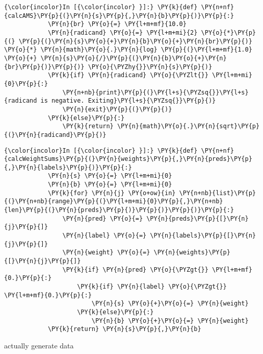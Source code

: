     \begin{Verbatim}[commandchars=\\\{\}]
{\color{incolor}In [{\color{incolor} }]:} \PY{k}{def} \PY{n+nf}{calcAMS}\PY{p}{(}\PY{n}{s}\PY{p}{,}\PY{n}{b}\PY{p}{)}\PY{p}{:}    
            \PY{n}{br} \PY{o}{=} \PY{l+m+mf}{10.0}
            \PY{n}{radicand} \PY{o}{=} \PY{l+m+mi}{2} \PY{o}{*}\PY{p}{(} \PY{p}{(}\PY{n}{s}\PY{o}{+}\PY{n}{b}\PY{o}{+}\PY{n}{br}\PY{p}{)} \PY{o}{*} \PY{n}{math}\PY{o}{.}\PY{n}{log} \PY{p}{(}\PY{l+m+mf}{1.0} \PY{o}{+} \PY{n}{s}\PY{o}{/}\PY{p}{(}\PY{n}{b}\PY{o}{+}\PY{n}{br}\PY{p}{)}\PY{p}{)} \PY{o}{\PYZhy{}}\PY{n}{s}\PY{p}{)}
            \PY{k}{if} \PY{n}{radicand} \PY{o}{\PYZlt{}} \PY{l+m+mi}{0}\PY{p}{:}
                \PY{n+nb}{print}\PY{p}{(}\PY{l+s}{\PYZsq{}}\PY{l+s}{radicand is negative. Exiting}\PY{l+s}{\PYZsq{}}\PY{p}{)}
                \PY{n}{exit}\PY{p}{(}\PY{p}{)}
            \PY{k}{else}\PY{p}{:}
                \PY{k}{return} \PY{n}{math}\PY{o}{.}\PY{n}{sqrt}\PY{p}{(}\PY{n}{radicand}\PY{p}{)}
\end{Verbatim}

    \begin{Verbatim}[commandchars=\\\{\}]
{\color{incolor}In [{\color{incolor} }]:} \PY{k}{def} \PY{n+nf}{calcWeightSums}\PY{p}{(}\PY{n}{weights}\PY{p}{,}\PY{n}{preds}\PY{p}{,}\PY{n}{labels}\PY{p}{)}\PY{p}{:}
            \PY{n}{s} \PY{o}{=} \PY{l+m+mi}{0}
            \PY{n}{b} \PY{o}{=} \PY{l+m+mi}{0}
            \PY{k}{for} \PY{n}{j} \PY{o+ow}{in} \PY{n+nb}{list}\PY{p}{(}\PY{n+nb}{range}\PY{p}{(}\PY{l+m+mi}{0}\PY{p}{,}\PY{n+nb}{len}\PY{p}{(}\PY{n}{preds}\PY{p}{)}\PY{p}{)}\PY{p}{)}\PY{p}{:}
                \PY{n}{pred} \PY{o}{=} \PY{n}{preds}\PY{p}{[}\PY{n}{j}\PY{p}{]}
                \PY{n}{label} \PY{o}{=} \PY{n}{labels}\PY{p}{[}\PY{n}{j}\PY{p}{]}
                \PY{n}{weight} \PY{o}{=} \PY{n}{weights}\PY{p}{[}\PY{n}{j}\PY{p}{]}
                \PY{k}{if} \PY{n}{pred} \PY{o}{\PYZgt{}} \PY{l+m+mf}{0.}\PY{p}{:}
                    \PY{k}{if} \PY{n}{label} \PY{o}{\PYZgt{}} \PY{l+m+mf}{0.}\PY{p}{:}
                        \PY{n}{s} \PY{o}{+}\PY{o}{=} \PY{n}{weight}
                    \PY{k}{else}\PY{p}{:}
                        \PY{n}{b} \PY{o}{+}\PY{o}{=} \PY{n}{weight}
            \PY{k}{return} \PY{n}{s}\PY{p}{,}\PY{n}{b}
\end{Verbatim}

    actually generate data

